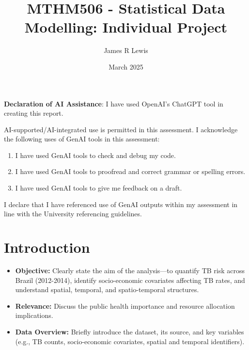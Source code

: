 \documentclass[
  11pt,
  a4paper,11pt]{article}
\title{MTHM506 - Statistical Data Modelling: Individual Project}
\author{James R Lewis}
\date{March 2025}
\providecommand{\tightlist}{%
  \setlength{\itemsep}{0pt}\setlength{\parskip}{0pt}}
\begin{document}
\maketitle

{
\setcounter{tocdepth}{2}
\tableofcontents
}
\textbf{Declaration of AI Assistance}: I have used OpenAI's ChatGPT tool
in creating this report.

AI-supported/AI-integrated use is permitted in this assessment. I
acknowledge the following uses of GenAI tools in this assessment:

\begin{enumerate}
\def\labelenumi{\arabic{enumi}.}
\tightlist
\item
  I have used GenAI tools to check and debug my code.
\item
  I have used GenAI tools to proofread and correct grammar or spelling
  errors.
\item
  I have used GenAI tools to give me feedback on a draft.
\end{enumerate}

I declare that I have referenced use of GenAI outputs within my
assessment in line with the University referencing guidelines.

\newpage

\section{Introduction}\label{introduction}

\begin{itemize}
\tightlist
\item
  \textbf{Objective:} Clearly state the aim of the analysis---to
  quantify TB risk across Brazil (2012-2014), identify socio-economic
  covariates affecting TB rates, and understand spatial, temporal, and
  spatio-temporal structures.
\end{itemize}

\begin{itemize}
\tightlist
\item
  \textbf{Relevance:} Discuss the public health importance and resource
  allocation implications.
\end{itemize}

\begin{itemize}
\tightlist
\item
  \textbf{Data Overview:} Briefly introduce the dataset, its source, and
  key variables (e.g., TB counts, socio-economic covariates, spatial and
  temporal identifiers).
\end{itemize}
\end{document}
